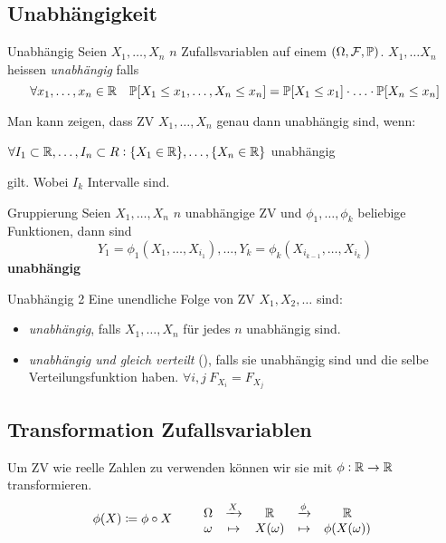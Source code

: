 \subsection{Unabhängigkeit}%
\label{sub:unabhangigkeit}

\begin{definition}{Unabhängig}
	Seien $X_1 , \ldots , X_n$ $n$ Zufallsvariablen auf einem $(\Omega, \mathcal{F} , \mathbb{P})$. $X_1 , \ldots X_n$ heissen
	\emph{unabhängig} falls
	\begin{equation*}
		\forall x_1 , \ldots , x_n \in \mathbb{R} \quad \mathbb{P} [X_1 \leq x_1, \ldots , X_n \leq x_n] = \mathbb{P} [X_1 \leq x_1] \cdot
		\ldots  \cdot \mathbb{P} [X_n \leq x_n]
	\end{equation*}
\end{definition}
Man kann zeigen, dass ZV $X_{1}, \ldots, X_{n}$ genau dann unabhängig sind, wenn:
\begin{center}
	$\forall I_1 \subset \mathbb{R} , \ldots , I_n \subset R: \{X_1 \in \mathbb{R}\}, \ldots , \{X_n \in \mathbb{R}\}$ unabhängig
\end{center}
gilt. Wobei $I_k$ Intervalle sind.
\begin{tprop}{Gruppierung}
	Seien $X_1 , \ldots , X_n$ $n$ unabhängige ZV und $\phi_1, \ldots , \phi_k$ beliebige Funktionen, dann sind
	\begin{equation*}
		Y_1 = \phi_1 (X_1 , \ldots , X_{i_1}) , \ldots , Y_k = \phi_k (X_{i_{k-1}}, \ldots , X_{i_k})
	\end{equation*}
	\textbf{unabhängig}
\end{tprop}
\begin{definition}{Unabhängig 2}
	Eine unendliche Folge von ZV $X_1 , X_2 , \ldots$ sind:
	\begin{itemize}
		\item \emph{unabhängig}, falls $X_1 , \ldots , X_n$ für jedes $n$ unabhängig sind.
		\item \emph{unabhängig und gleich verteilt} (\iid), falls sie unabhängig sind und die selbe
			Verteilungsfunktion haben. $\forall i,j ~ F_{X_i} = F_{X_j}$
	\end{itemize}
\end{definition}


\subsection{Transformation Zufallsvariablen}%
\label{sub:transformation_zufallsvariablen}

Um ZV wie reelle Zahlen zu verwenden können wir sie mit $\phi : \mathbb{R} \rightarrow \mathbb{R}$ transformieren.
\begin{equation*}
	\phi (X) \coloneqq \phi \circ X \qquad
	\begin{array}{ccccc}
		\Omega & \xrightarrow{X} & \mathbb{R} & \xrightarrow{\phi} & \mathbb{R}\\
		\omega & \mapsto & X(\omega) & \mapsto & \phi (X(\omega))
	\end{array}
\end{equation*}


